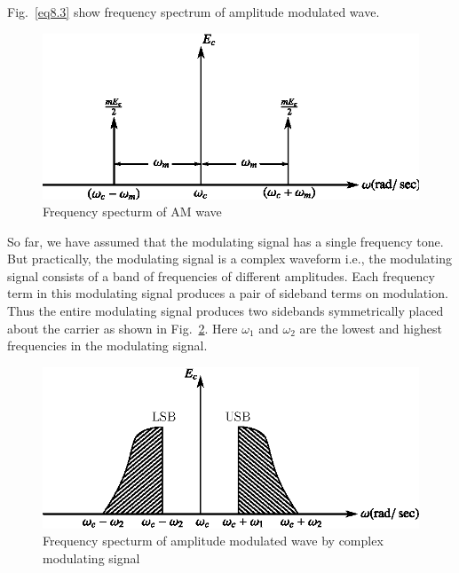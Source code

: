 \eject

Fig.~\ref{eq8.3} show frequency spectrum of amplitude modulated
wave.
\begin{figure}[H]
\centering
\includegraphics{chap8/fig8.3.eps}
\caption{Frequency specturm of AM wave}\label{fig8.3}
\end{figure}

So far, we have assumed that the modulating signal has a single
frequency tone. But practically, the modulating signal is a complex
waveform i.e., the modulating signal consists of a band of frequencies
of different amplitudes. Each frequency term in this modulating signal
produces a pair of sideband terms on modulation. Thus the entire
modulating signal produces two sidebands symmetrically placed about
the carrier as shown in Fig.~\ref{fig8.4}. Here $\omega_1$ and
$\omega_2$ are the lowest and highest frequencies in the modulating
signal.
\begin{figure}[H]
\centering
\includegraphics{chap8/fig8.4.eps}
\caption{Frequency specturm of amplitude modulated wave by complex
modulating signal}\label{fig8.4}
\end{figure}

